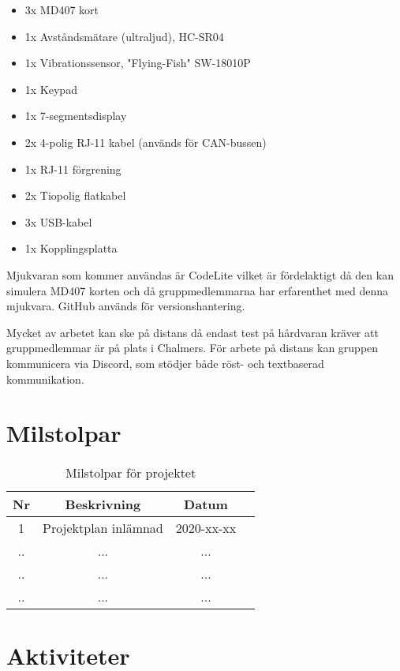 \documentclass{article}
\begin{document}
\begin{itemize}
    \item 3x MD407 kort
    \item 1x Avståndsmätare (ultraljud), HC-SR04
    \item 1x Vibrationssensor, "Flying-Fish" SW-18010P
    \item 1x Keypad
    \item 1x 7-segmentsdisplay
    \item 2x 4-polig RJ-11 kabel (används för CAN-bussen)
    \item 1x RJ-11 förgrening
    \item 2x Tiopolig flatkabel
    \item 3x USB-kabel
    \item 1x Kopplingsplatta
\end{itemize}

Mjukvaran som kommer användas är CodeLite vilket är fördelaktigt då den kan simulera MD407 korten och då gruppmedlemmarna har erfarenthet med denna mjukvara. GitHub används för versionshantering.

Mycket av arbetet kan ske på distans då endast test på hårdvaran kräver att gruppmedlemmar är på plats i Chalmers. För arbete på distans kan gruppen kommunicera via Discord, som stödjer både röst- och textbaserad kommunikation.

\section{Milstolpar}

\begin{table}[!h]
    \begin{center}
    \begin{tabular}{ |c|c|c|c| }\hline
    Nr & Beskrivning & Datum \\\hline\hline
    1 & Projektplan inlämnad & 2020-xx-xx \\\hline
    .. & ... & ... \\\hline
    .. & ... & ... \\\hline
    .. & ... & ... \\\hline
    \end{tabular}
    \caption{Milstolpar för projektet}
    \label{milstolpar}
    \end{center}
\end{table}

\section{Aktiviteter}
\end{document}
